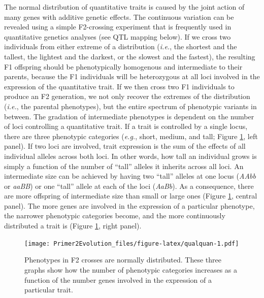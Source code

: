 \documentclass[
]{book}
\begin{document}
The normal distribution of quantitative traits is caused by the joint action of many genes with additive genetic effects. The continuous variation can be revealed using a simple F2-crossing experiment that is frequently used in quantitative genetics analyses (see QTL mapping below). If we cross two individuals from either extreme of a distribution (\emph{i.e.}, the shortest and the tallest, the lightest and the darkest, or the slowest and the fastest), the resulting F1 offspring should be phenotypically homogenous and intermediate to their parents, because the F1 individuals will be heterozygous at all loci involved in the expression of the quantitative trait. If we then cross two F1 individuals to produce an F2 generation, we not only recover the extremes of the distribution (\emph{i.e.}, the parental phenotypes), but the entire spectrum of phenotypic variants in between. The gradation of intermediate phenotypes is dependent on the number of loci controlling a quantitative trait. If a trait is controlled by a single locus, there are three phenotypic categories (\emph{e.g.}, short, medium, and tall; Figure \ref{fig:qualquan}, left panel). If two loci are involved, trait expression is the sum of the effects of all individual alleles across both loci. In other words, how tall an individual grows is simply a function of the number of ``tall'' alleles it inherits across all loci. An intermediate size can be achieved by having two ``tall'' alleles at one locus (\emph{AAbb} or \emph{aaBB}) or one ``tall'' allele at each of the loci (\emph{AaBb}). As a consequence, there are more offspring of intermediate size than small or large ones (Figure \ref{fig:qualquan}, central panel). The more genes are involved in the expression of a particular phenotype, the narrower phenotypic categories become, and the more continuously distributed a trait is (Figure \ref{fig:qualquan}, right panel).

\begin{figure}
\centering
\texttt{[image: Primer2Evolution\_files/figure-latex/qualquan-1.pdf]}
\caption{\label{fig:qualquan}Phenotypes in F2 crosses are normally distributed. These three graphs show how the number of phenotypic categories increases as a function of the number genes involved in the expression of a particular trait.}
\end{figure}
\end{document}
